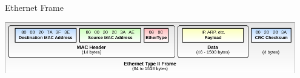 \begin{frame}{Ethernet Frame}

\includegraphics[width=0.95\textwidth]{../../slides/networking/net_eth_frame.png}

\end{frame}


